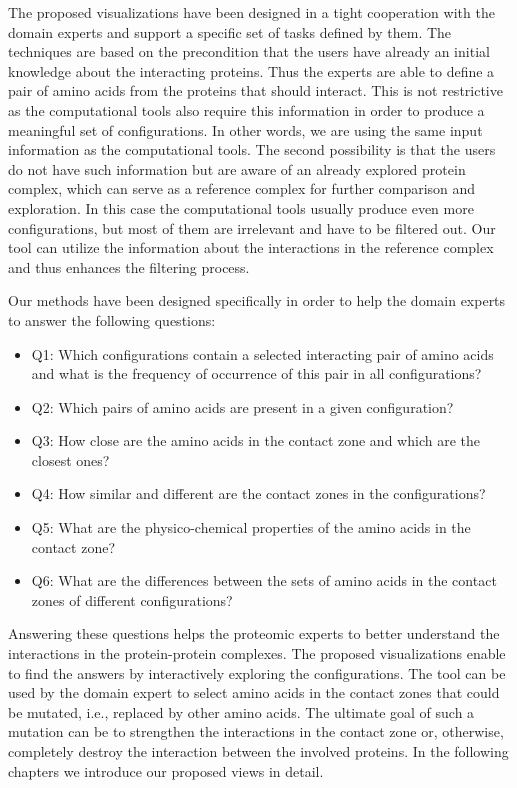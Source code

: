 \documentclass{bmcart}
\begin{document}
The proposed visualizations have been designed in a tight cooperation with the domain experts and support a specific set of tasks defined by them.
The techniques are based on the precondition that the users have already an initial knowledge about the interacting proteins.
Thus the experts are able to define a pair of amino acids from the proteins that should interact.
This is not restrictive as the computational tools also require this information in order to produce a meaningful set of configurations. 
In other words, we are using the same input information as the computational tools.
The second possibility is that the users do not have such information but are aware of an already explored protein complex, which can serve as a reference complex for further comparison and exploration. 
In this case the computational tools usually produce even more configurations, but most of them are irrelevant and have to be filtered out. 
Our tool can utilize the information about the interactions in the reference complex and thus enhances the filtering process.

Our methods have been designed specifically in order to help the domain experts to answer the following questions:
\begin{itemize}
\item Q1: Which configurations contain a selected interacting pair of amino acids and what is the frequency of occurrence of this pair in all configurations?
\item Q2: Which pairs of amino acids are present in a given configuration?
\item Q3: How close are the amino acids in the contact zone and which are the closest ones?
\item Q4: How similar and different are the contact zones in the configurations?
\item Q5: What are the physico-chemical properties of the amino acids in the contact zone?
\item Q6: What are the differences between the sets of amino acids in the contact zones of different configurations?
\end{itemize}

Answering these questions helps the proteomic experts to better understand the interactions in the protein-protein complexes.
The proposed visualizations enable to find the answers by interactively exploring the configurations.
The tool can be used by the domain expert to select amino acids in the contact zones that could be mutated, i.e., replaced by other amino acids.
The ultimate goal of such a mutation can be to strengthen the interactions in the contact zone or, otherwise, completely destroy the interaction between the involved proteins. 
In the following chapters we introduce our proposed views in detail.
\end{document}

